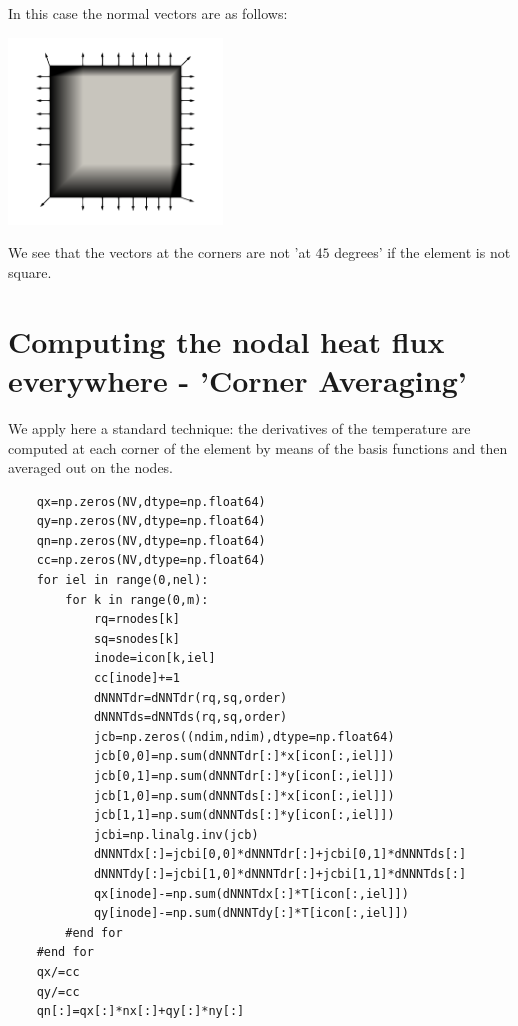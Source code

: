 In this case the normal vectors are as follows:
\begin{center}
\includegraphics[width=5.7cm]{python_codes/fieldstone_173/results/exp1/normals}
\end{center}
We see that the vectors at the corners are not 'at $45$ degrees' if the element is not square.


\section*{Computing the nodal heat flux everywhere - 'Corner Averaging'}

We apply here a standard technique: the derivatives of the temperature 
are computed at each corner of the element by means of the basis functions
and then averaged out on the nodes.

\begin{lstlisting}
    qx=np.zeros(NV,dtype=np.float64) 
    qy=np.zeros(NV,dtype=np.float64) 
    qn=np.zeros(NV,dtype=np.float64) 
    cc=np.zeros(NV,dtype=np.float64) 
    for iel in range(0,nel):
        for k in range(0,m):
            rq=rnodes[k]
            sq=snodes[k]
            inode=icon[k,iel]
            cc[inode]+=1
            dNNNTdr=dNNTdr(rq,sq,order)
            dNNNTds=dNNTds(rq,sq,order)
            jcb=np.zeros((ndim,ndim),dtype=np.float64)
            jcb[0,0]=np.sum(dNNNTdr[:]*x[icon[:,iel]])
            jcb[0,1]=np.sum(dNNNTdr[:]*y[icon[:,iel]])
            jcb[1,0]=np.sum(dNNNTds[:]*x[icon[:,iel]])
            jcb[1,1]=np.sum(dNNNTds[:]*y[icon[:,iel]])
            jcbi=np.linalg.inv(jcb)
            dNNNTdx[:]=jcbi[0,0]*dNNNTdr[:]+jcbi[0,1]*dNNNTds[:]
            dNNNTdy[:]=jcbi[1,0]*dNNNTdr[:]+jcbi[1,1]*dNNNTds[:]
            qx[inode]-=np.sum(dNNNTdx[:]*T[icon[:,iel]])
            qy[inode]-=np.sum(dNNNTdy[:]*T[icon[:,iel]])
        #end for
    #end for
    qx/=cc
    qy/=cc
    qn[:]=qx[:]*nx[:]+qy[:]*ny[:]
\end{lstlisting}




